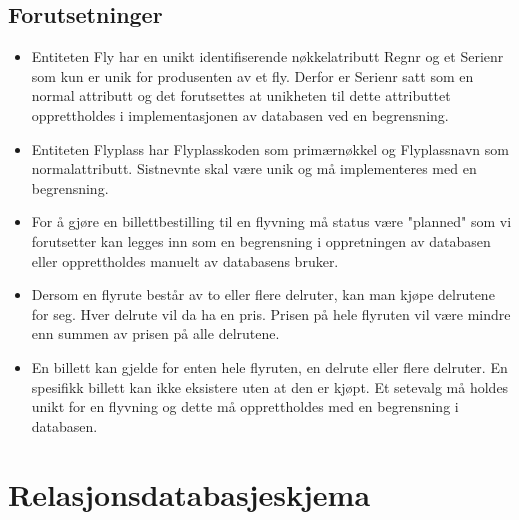 \documentclass[a4paper,12pt]{article}
\begin{document}
\subsection{Forutsetninger}
\begin{itemize}
\item Entiteten Fly har en unikt identifiserende nøkkelatributt Regnr og et Serienr som kun er unik for produsenten av et fly. Derfor er Serienr satt som en normal attributt og det forutsettes at unikheten til dette attributtet opprettholdes i implementasjonen av databasen ved en begrensning.  
\item Entiteten Flyplass har Flyplasskoden som primærnøkkel og Flyplassnavn som normalattributt. Sistnevnte skal være unik og må implementeres med en begrensning.
\item For å gjøre en billettbestilling til en flyvning må status være "planned" som vi forutsetter kan legges inn som en begrensning i oppretningen av databasen eller opprettholdes manuelt av databasens bruker. 
\item Dersom en flyrute består av to eller flere delruter, kan man kjøpe delrutene for seg. Hver delrute vil da ha en pris. Prisen på hele flyruten vil være
mindre enn summen av prisen på alle delrutene. 
\item En billett kan gjelde for enten hele flyruten, en delrute eller flere delruter. En spesifikk billett kan ikke eksistere uten at den er kjøpt. Et setevalg må holdes unikt for en flyvning og dette må opprettholdes med en begrensning i databasen.
\end{itemize}

\newpage{}

\section{Relasjonsdatabasjeskjema}
\end{document}
